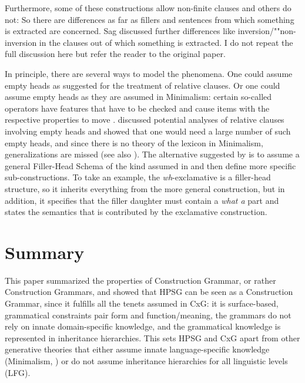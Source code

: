 \documentclass[output=paper
	        ,collection
	        ,collectionchapter
 	        ,biblatex
                ,babelshorthands
                ,newtxmath
                ,draftmode
                ,colorlinks, citecolor=brown
]{langscibook}
\begin{document}
Furthermore, some of these constructions allow non-finite clauses and others do not:
\eal
{}
\zl
So there are differences as far as fillers and sentences from which something is extracted
are concerned. Sag discussed further differences like inversion/""non-inversion in the clauses out of
which something is extracted. I do not repeat the full discussion here but refer the reader to the
original paper.

In principle, there are several ways to model the phenomena. One could assume empty
heads as \citet[Chapter~5]{ps2} suggested for the treatment of relative clauses. Or one could assume empty
heads as they are assumed in Minimalism: certain so-called operators have features that have to be
checked and cause items with the respective properties to move \citep[--331]{Adger2003a}. \citet{Borsley2006a} discussed potential
analyses of relative clauses involving empty heads and showed that one would need a large number of
such empty heads, and since there is no theory of the lexicon in Minimalism, generalizations are
missed (see also ). The alternative suggested by
\citet{Sag2010b} is to assume a general Filler-Head Schema of the kind assumed in \citet{ps2} and
then define more specific sub-constructions. To take an example, the \emph{wh}-exclamative is a filler-head
structure, so it inherits everything from the more general construction, but in addition, it
specifies that the filler daughter must contain a \emph{what a} part and states the semantics that is
contributed by the exclamative construction.


\section{Summary}
\label{sec-summary}

This paper summarized the properties of Construction Grammar, or rather Construction Grammars, and
showed that HPSG can be seen as a Construction Grammar, since it fulfills all the tenets assumed in
CxG: it is surface-based, grammatical constraints pair form and function/meaning, the grammars do
not rely on innate domain-specific knowledge, and the grammatical knowledge is represented in
inheritance hierarchies. This sets HPSG and CxG apart from other generative theories that either
assume innate language-specific knowledge (Minimalism, \eg
\citealt{Chomsky2013a,Kayne94a-u,CR2010a}) or do not assume inheritance hierarchies for all linguistic levels (\eg LFG).
\end{document}
